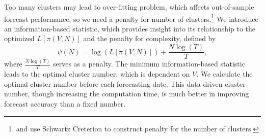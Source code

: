 \documentclass[preprint,12pt,authoryear]{elsarticle}
\begin{document}
	
	

{\color{red}Too many clusters may lead to over-fitting problem, which affects out-of-sample forecast performance, so we need a penalty for number of clusters.\footnote{\cite{Yao1988} and \cite{Kuehn2001} use Schwartz Creterion to construct penalty for the number of clusters.}} We introduce an
information-based statistic, which provides insight into its
relationship to the optimized $L\left[\pi\left(V,N\right)\right]$ and the penalty for
complexity, defined by
 \begin{equation}\label{xiaopei1}\psi(N) = \log(L\left[\pi\left(V,N\right)\right]) + \frac{N\log(T)}{T}, \end{equation}
 where $\frac{N\log(T)}{T}$ serves as a penalty. The minimum information-based statistic leads to the optimal cluster number, which is dependent on $V$. {We calculate the optimal cluster number before each forecasting date. This data-driven cluster number, though increasing the computation time, is much better in improving forecast accuracy than a fixed number}.
\end{document}
